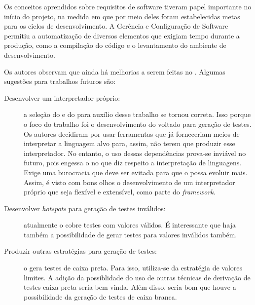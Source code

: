 Os conceitos aprendidos sobre  requisitos de software tiveram papel importante no início
do projeto, na medida em que por meio deles foram estabelecidas metas para os
ciclos de desenvolvimento. A Gerência e Configuração de Software permitiu a
automatização de diversos elementos que exigiam tempo durante a produção,
como a compilação do código e o levantamento do ambiente de desenvolvimento.


Os autores observam que ainda há melhorias a serem feitas no \Scarefault. Algumas
sugestões para trabalhos futuros são:

\begin{description}
\item[Desenvolver um interpretador próprio:] a seleção do \flexcpp e do \bisoncpp para
auxílio desse trabalho se tornou correta. Isso porque o foco do trabalho foi o
desenvolvimento do \framework voltado para geração de testes. Os autores decidiram
por usar ferramentas que já forneceriam meios de interpretar a linguagem alvo para,
assim, não terem que produzir esse interpretador. No entanto, o uso dessas
dependências prova-se inviável no futuro, pois engessa o \framework no que diz
respeito a interpretação de linguagens. Exige uma burocracia que deve ser evitada
para que o \scarefault possa evoluir mais. Assim, é visto com bons olhos o
desenvolvimento de um interpretador próprio que seja flexível e extensível, como
parte do \textit{framework}.
\item[Desenvolver \textit{hotspots} para geração de testes inválidos:] atualmente
o \scarefault cobre testes com valores válidos. É interessante que haja também a
possibilidade de gerar testes para valores inválidos também.
\item[Produzir outras estratégias para geração de testes:] o \scarefault gera
testes de caixa preta. Para isso, utiliza-se da estratégia de valores limites. A
adição da possiblidade do uso de outras técnicas de derivação de testes caixa preta
seria bem vinda. Além disso, seria bom que houve a possibilidade da geração
de testes de caixa branca.
\end{description}
